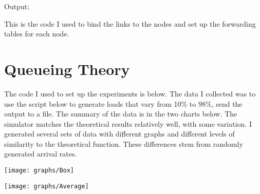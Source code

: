 \documentclass[11pt]{article}
\begin{document}


\vspace{1.0cm}

\noindent Output:



\vspace{1.0cm}

This is the code I used to bind the links to the nodes and set up the forwarding tables for each node.



\section{Queueing Theory}

The code I used to set up the experiments is below. The data I collected was to use the script below to generate loads that vary from 10\% to 98\%, send the output to a file. The summary of the data is in the two charts below. The simulator matches the theoretical results relatively well, with some variation. I generated several sets of data with different graphs and different levels of similarity to the theoretical function. These differences stem from randomly generated arrival rates.

\texttt{[image: graphs/Box]}

\texttt{[image: graphs/Average]}


\end{document}

